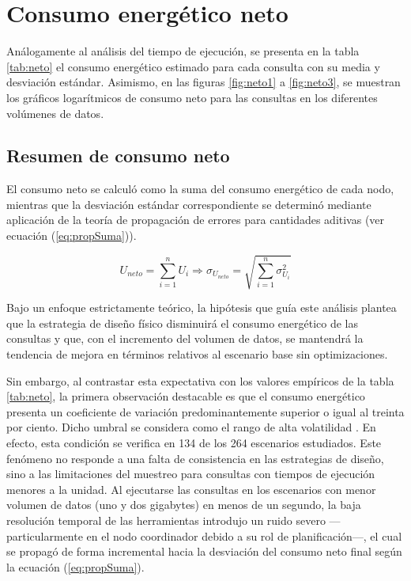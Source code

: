 \documentclass[12pt, letter paper]{report}
\begin{document}
    \section{Consumo energético neto} %
    \label{sec:consumo_energético_neto}
      Análogamente al análisis del tiempo de ejecución, se presenta en la tabla
      \ref{tab:neto} el consumo energético estimado para cada consulta con su
      media y desviación estándar. Asimismo, en las figuras \ref{fig:neto1} a
      \ref{fig:neto3}, se muestran los gráficos logarítmicos de consumo neto
      para las consultas en los diferentes volúmenes de datos.

      \subsection{Resumen de consumo neto} %
      \label{sub:resumen_de_consumo_neto}
        El consumo neto se calculó como la suma del consumo energético de cada
        nodo, mientras que la desviación estándar correspondiente se determinó
        mediante aplicación de la teoría de propagación de errores para
        cantidades aditivas \cite{skoog2013fundamentals} (ver ecuación
        (\ref{eq:propSuma})).

        \begin{equation}
          U_{neto} = \sum_{i = 1}^n U_i \Rightarrow
          \boxed{\sigma_{U_{neto}} = \sqrt{\sum_{i = 1}^n \sigma_{U_i}^2}}
          \label{eq:propSuma}
        \end{equation}

        Bajo un enfoque estrictamente teórico, la hipótesis que guía este
        análisis plantea que la estrategia de diseño físico disminuirá el
        consumo energético de las consultas y que, con el incremento del volumen
        de datos, se mantendrá la tendencia de mejora en términos relativos al
        escenario base sin optimizaciones.

        Sin embargo, al contrastar esta expectativa con los valores empíricos de
        la tabla \ref{tab:neto}, la primera observación destacable es que el
        consumo energético presenta un coeficiente de variación
        predominantemente superior o igual al treinta por ciento. Dicho umbral
        se considera como el rango de alta volatilidad \cite{jain1991art,
        montgomery2017design}. En efecto, esta condición se verifica en 134 de
        los 264 escenarios estudiados. Este fenómeno no responde a una falta de
        consistencia en las estrategias de diseño, sino a las limitaciones del
        muestreo para consultas con tiempos de ejecución menores a la unidad. Al
        ejecutarse las consultas en los escenarios con menor volumen de datos
        (uno y dos gigabytes) en menos de un segundo, la baja resolución
        temporal de las herramientas introdujo un ruido severo
        ---particularmente en el nodo coordinador debido a su rol de
        planificación---, el cual se propagó de forma incremental hacia la
        desviación del consumo neto final según la ecuación (\ref{eq:propSuma}).
\end{document}
